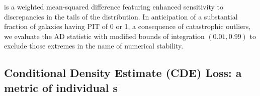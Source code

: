 is a weighted mean-squared difference featuring enhanced sensitivity to discrepancies in the tails of the distribution.
In anticipation of a substantial fraction of galaxies having PIT of 0 or 1, a consequence of catastrophic outliers, we evaluate the AD statistic with modified bounds of integration $(0.01, 0.99)$ to exclude those extremes in the name of numerical stability.


\subsection{Conditional Density Estimate (CDE) Loss: a metric of individual \pzpdf s}
\label{sec:CDE_loss}

